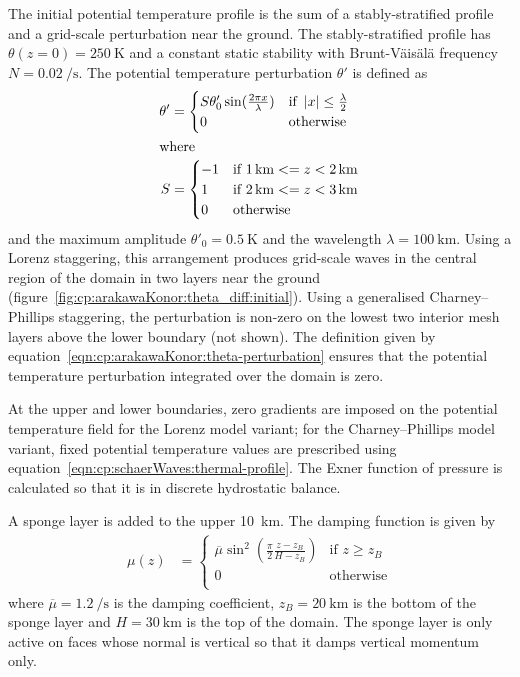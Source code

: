 The initial potential temperature profile is the sum of a stably-stratified profile and a grid-scale perturbation near the ground.
The stably-stratified profile has $\theta(z = 0) = \SI{250}{\kelvin}$ and a constant static stability with Brunt-V\"ais\"al\"a frequency $N = \SI{0.02}{\per\second}$.
The potential temperature perturbation $\theta'$ is defined as
\begin{subequations}
\label{eqn:cp:arakawaKonor:theta-perturbation}
\begin{align}
	\theta' &= \begin{cases} S \theta'_0 \sin(\frac{2 \pi x}{\lambda}) & \text{if } \left\lvert x \right\rvert \leq \frac{\lambda}{2} \\
		0 & \text{otherwise} \\
	\end{cases} \\
\shortintertext{where}
	S &= \begin{cases}
		-1 & \text{if } \SI{1}{\kilo\meter} <= z < \SI{2}{\kilo\meter} \\
		1 & \text{if } \SI{2}{\kilo\meter} <= z < \SI{3}{\kilo\meter} \\
		0 & \text{otherwise} \\
	\end{cases}
\end{align}
\end{subequations}
and the maximum amplitude $\theta'_0 = \SI{0.5}{\kelvin}$ and the wavelength $\lambda = \SI{100}{\kilo\meter}$.
Using a Lorenz staggering, this arrangement produces grid-scale waves in the central region of the domain in two layers near the ground (figure~\ref{fig:cp:arakawaKonor:theta_diff:initial}).
Using a generalised Charney--Phillips staggering, the perturbation is non-zero on the lowest two interior mesh layers above the lower boundary (not shown).
The definition given by equation~\eqref{eqn:cp:arakawaKonor:theta-perturbation} ensures that the potential temperature perturbation integrated over the domain is zero.

At the upper and lower boundaries, zero gradients are imposed on the potential temperature field for the Lorenz model variant; for the Charney--Phillips model variant, fixed potential temperature values are prescribed using equation~\ref{eqn:cp:schaerWaves:thermal-profile}.
The Exner function of pressure is calculated so that it is in discrete hydrostatic balance.

A sponge layer is added to the upper \SI{10}{\kilo\meter}.  The damping function is given by
\begin{align}
	\mu(z) &= \begin{cases}
		\overline{\mu} \sin^2 \left( \frac{\pi}{2} \frac{z - z_B}{H - z_B} \right) & \text{if } z \geq z_B \\
		0 & \text{otherwise} \\
	\end{cases}
\end{align}
where $\overline{\mu} = \SI{1.2}{\per\second}$ is the damping coefficient, $z_B = \SI{20}{\kilo\meter}$ is the bottom of the sponge layer and $H = \SI{30}{\kilo\meter}$ is the top of the domain.
The sponge layer is only active on faces whose normal is vertical so that it damps vertical momentum only.

